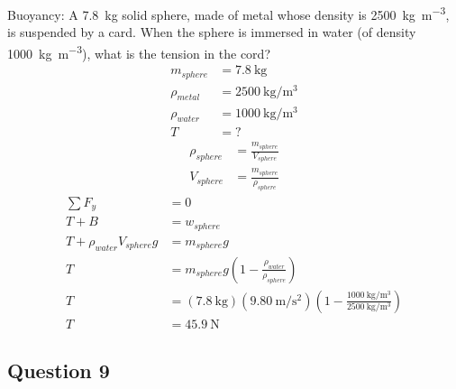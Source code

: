 \documentclass{article}
\begin{document}
Buoyancy: A \SI{7.8}{\kilogram} solid sphere, made of metal whose density is \SI{2500}{\kilogram \per \meter \cubed}, is suspended by a card. When the sphere is immersed in water (of density \SI{1000}{\kilogram \per \meter \cubed}), what is the tension in the cord?
\begin{align*}
	m_{sphere} & = \SI{7.8}{\kilogram} \\
	\rho_{metal} & = \SI{2500}{\kilogram \per \meter \cubed} \\
	\rho_{water} & = \SI{1000}{\kilogram \per \meter \cubed} \\
	T & = ?
\end{align*}
\begin{align*}
	\rho_{sphere} & = \frac{ m_{sphere} }{ V_{sphere} } \\
	V_{sphere} & = \frac{ m_{sphere} }{ \rho_{sphere} }
\end{align*}
\begin{align*}
	\sum F_y & = 0 \\
	T + B & = w_{sphere} \\
	T + \rho_{water}V_{sphere}g & = m_{sphere}g \\
	T & = m_{sphere}g \left( 1 - \frac{ \rho_{water} }{ \rho_{sphere} } \right) \\
	T & = (\SI{7.8}{\kilogram})(\SI{9.80}{\meter \per \second \squared}) \left( 1 - \frac{ \SI{1000}{\kilogram \per \meter \cubed} }{ \SI{2500}{\kilogram \per \meter \cubed} } \right) \\
	T & = \SI{45.9}{\newton}
\end{align*}

\subsection{Question 9}
\end{document}
